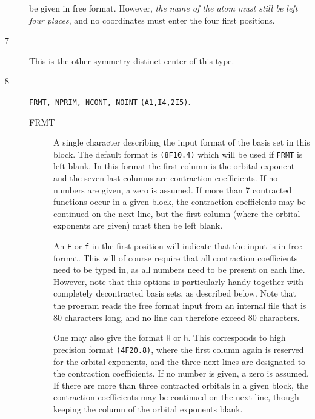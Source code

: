 \begin{description}
be given in free format. However, {\em the name of the atom must still be
left four places}, and no coordinates must enter the four first
positions.
\item[7] This is the other symmetry-distinct center of this type.
\item[8] \verb|FRMT, NPRIM, NCONT, NOINT| {\tt (A1,I4,2I5)}.
\begin{description}
\item[FRMT] A single character describing the input format of the
basis set in this block. The default format is {\tt (8F10.4)} which
will be used if {\tt FRMT} is left blank. In this format
the first column is the orbital exponent and the seven last columns
are contraction coefficients. If no numbers are given, a zero is
assumed. If more than 7 contracted functions occur in a given block,
the contraction coefficients may be continued on the next line, but
the first column (where the orbital exponents are given) must then be
left blank.

An {\tt F} or {\tt f} in the first position will indicate that the
input is in free format. This will of course require that all
contraction coefficients need to be typed in, as all numbers need
to be present on each line. However, note that this options is
particularly handy together with completely decontracted basis
sets, as described below. Note that the program reads the free
format input from an internal file that is 80 characters long, and
no line can therefore exceed 80 characters.

One may also give the format {\tt H} or {\tt h}. This corresponds to
high precision format {\tt (4F20.8)}, where the first column again is
reserved for the orbital exponents, and the three next lines are
designated to the contraction coefficients. If no number is given, a zero
is assumed. If there are more than three contracted orbitals in a
given block, the contraction coefficients may be continued on the next
line, though keeping the column of the orbital exponents blank.


\end{description}
\end{description}
